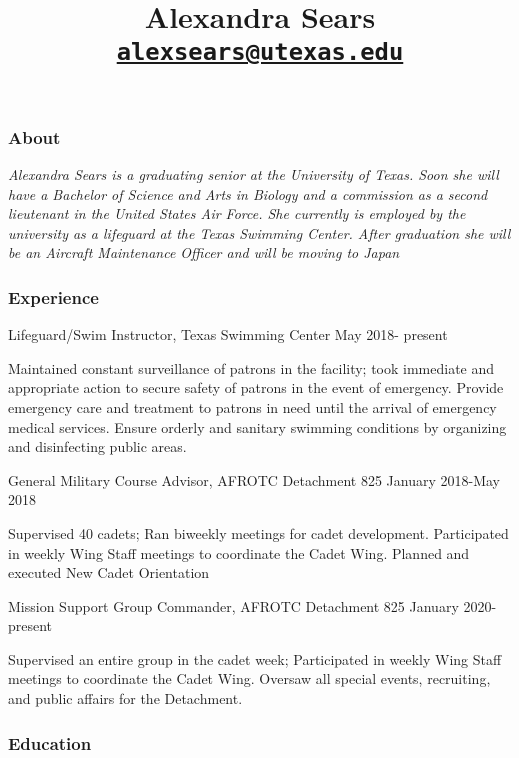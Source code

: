 \documentclass[]{article}
\title{Alexandra Sears
\href{mailto:alexsears@utexas.edu}{\nolinkurl{alexsears@utexas.edu}}}
\author{}
\date{\vspace{-2.5em}}
\begin{document}
\maketitle

\hypertarget{about}{%
\subsubsection{About}\label{about}}

\emph{Alexandra Sears is a graduating senior at the University of Texas.
Soon she will have a Bachelor of Science and Arts in Biology and a
commission as a second lieutenant in the United States Air Force. She
currently is employed by the university as a lifeguard at the Texas
Swimming Center. After graduation she will be an Aircraft Maintenance
Officer and will be moving to Japan}

\hypertarget{experience}{%
\subsubsection{Experience}\label{experience}}

Lifeguard/Swim Instructor, Texas Swimming Center May 2018- present

Maintained constant surveillance of patrons in the facility; took
immediate and appropriate action to secure safety of patrons in the
event of emergency. Provide emergency care and treatment to patrons in
need until the arrival of emergency medical services. Ensure orderly and
sanitary swimming conditions by organizing and disinfecting public
areas.

General Military Course Advisor, AFROTC Detachment 825 January 2018-May
2018

Supervised 40 cadets; Ran biweekly meetings for cadet development.
Participated in weekly Wing Staff meetings to coordinate the Cadet Wing.
Planned and executed New Cadet Orientation

Mission Support Group Commander, AFROTC Detachment 825 January
2020-present

Supervised an entire group in the cadet week; Participated in weekly
Wing Staff meetings to coordinate the Cadet Wing. Oversaw all special
events, recruiting, and public affairs for the Detachment.

\hypertarget{education}{%
\subsubsection{Education}\label{education}}
\end{document}
